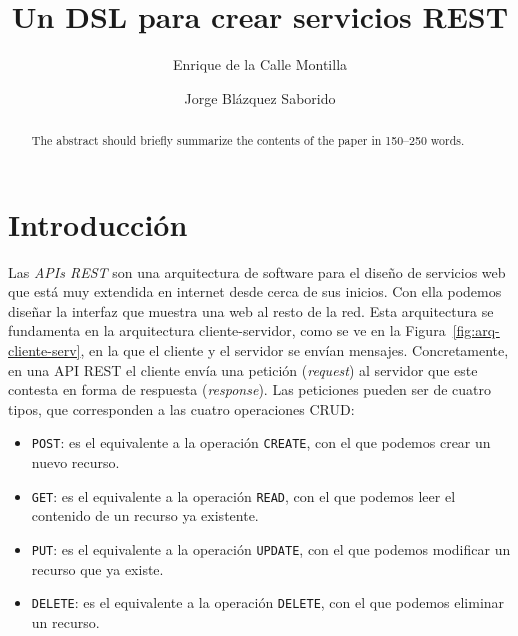 \documentclass[runningheads]{llncs}
\begin{document}
\title{Un DSL para crear servicios REST}

\author{Enrique de la Calle Montilla\and
Jorge Blázquez Saborido}

\maketitle

\begin{abstract}
The abstract should briefly summarize the contents of the paper in
150--250 words.

\end{abstract}

\section{Introducción}


Las \emph{APIs REST} son una arquitectura de software para el diseño
de servicios web que está muy extendida en internet desde cerca de
sus inicios. Con ella podemos diseñar la interfaz que muestra una web
al resto de la red. Esta arquitectura se fundamenta en la arquitectura
cliente-servidor, como se ve en la Figura~\ref{fig:arq-cliente-serv},
en la que el cliente y el servidor se envían mensajes. Concretamente,
en una API REST el cliente envía una petición (\emph{request}) al
servidor que este contesta en forma de respuesta (\emph{response}). Las
peticiones pueden ser de cuatro tipos, que corresponden a las
cuatro operaciones CRUD:

\newcommand\POST{\texttt{POST}}
\newcommand\GET{\texttt{GET}}
\newcommand\PUT{\texttt{PUT}}
\newcommand\DELETE{\texttt{DELETE}}

\newcommand\CREATE{\texttt{CREATE}}
\newcommand\READ{\texttt{READ}}
\newcommand\UPDATE{\texttt{UPDATE}}

\begin{itemize}
    \item \POST: es el equivalente a la operación \CREATE, con el que podemos
        crear un nuevo recurso.
    \item \GET: es el equivalente a la operación \READ, con el que podemos
        leer el contenido de un recurso ya existente.
    \item \PUT: es el equivalente a la operación \UPDATE, con el que podemos
        modificar un recurso que ya existe.
    \item \DELETE: es el equivalente a la operación \DELETE, con el que podemos
        eliminar un recurso.
\end{itemize}
\end{document}
